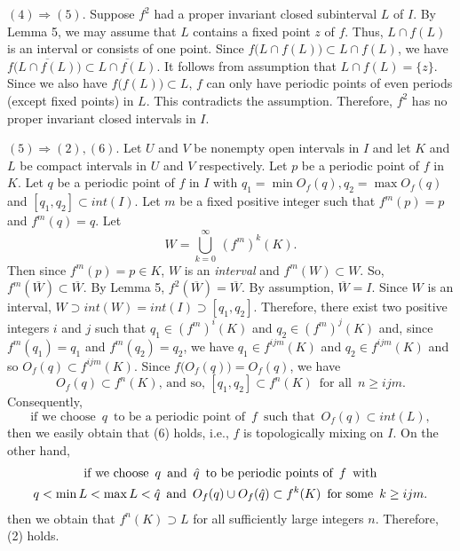 \documentclass[12pt]{article}
\newcommand{\ov}{\overline}
\begin{document}
${(4)} \Rightarrow {(5)}$.  Suppose $f^2$ had a proper invariant closed subinterval $L$ of $I$.  By Lemma 5, we may assume that $L$ contains a fixed point $z$ of $f$.  Thus, $L \cap f(L)$ is an interval or consists of one point.  Since $f\big(L \cap f(L)\big) \subset L \cap f(L)$, we have $f\big(\overline{L \cap f(L)}\big) \subset \overline{L \cap f(L)}$.  It follows from assumption that $L \cap f(L) = \{ z \}$.  Since we also have $f\big(f(L)\big) \subset L$, $f$ can only have periodic points of even periods (except fixed points) in $L$.  This contradicts the assumption.  Therefore, $f^2$ has no proper invariant closed intervals in $I$.  

${(5)} \Rightarrow {(2)}, {(6)}$.  Let $U$ and $V$ be nonempty open intervals in $I$ and let $K$ and $L$ be compact intervals in $U$ and $V$ respectively.  Let $p$ be a periodic point of $f$ in $K$.  Let $q$ be a periodic point of $f$ in $I$ with $q_1 = \min O_f(q), q_2 = \max O_f(q)$ and $[q_1, q_2] \subset int(I)$.  Let $m$ be a fixed positive integer such that $f^m(p) = p$ and $f^m(q) = q$.  Let 
$$
W = \bigcup_{k=0}^\infty \, (f^m)^k(K).
$$
Then since $f^m(p) = p \in K$, $W$ is an {\it interval} and $f^m(W) \subset W$.  So, $f^m(\ov W) \subset \ov W$.  By Lemma 5, $f^2(\ov W) = \ov W$.  By assumption, $\ov W = I$.  Since $W$ is an interval, $W \supset int(W) = int(I) \supset [q_1, q_2]$.  Therefore, there exist two positive integers $i$ and $j$ such that $q_1 \in (f^m)^i(K)$ and $q_2 \in (f^m)^j(K)$ and, since $f^m(q_1) = q_1$ and $f^m(q_2) = q_2$, we have $q_1 \in f^{ijm}(K)$ and $q_2 \in f^{ijm}(K)$ and so $O_f(q) \subset f^{ijm}(K)$.  Since $f\big(O_f(q)\big) = O_f(q)$, we have
$$
O_f(q) \subset f^n(K), \, \text{and so}, \, [q_1, q_2] \subset f^n(K) \,\,\, \text{for all} \,\,\, n \ge ijm.
$$
Consequently,
$$
\text{if we choose} \,\,\, q \,\,\, \text{to be a periodic point of} \,\,\, f \,\,\, \text{such that} \,\,\, O_f(q) \subset int(L),
$$
then we easily obtain that (6) holds, i.e., $f$ is topologically mixing on $I$.  On the other hand,\begin{multline*}$$\text{if we choose} \,\,\, q \,\,\, \text{and} \,\,\, \hat q \,\,\, \text{to be periodic points of} \,\,\,f \,\,\, \text{with} \\ q < \min L < \max L < \hat q \,\,\, \text{and} \,\,\, O_f(q) \cup O_f(\hat q) \subset f^k(K) \,\,\, \text{for some} \,\,\, k \ge ijm.$$\end{multline*}then we obtain that $f^n(K) \supset L$ for all sufficiently large integers $n$.  Therefore, (2) holds. 
\end{document}
